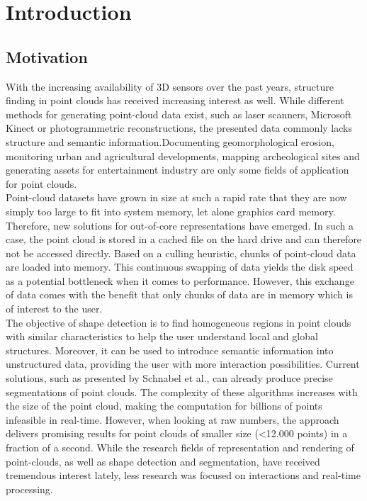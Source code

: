 \chapter{Introduction}
\newpage

\section{Motivation}

With the increasing availability of 3D sensors over the past years, structure finding in point clouds has received increasing interest as well. While different methods for generating point-cloud data exist, such as laser scanners, Microsoft Kinect or photogrammetric reconstructions, the presented data commonly lacks structure and semantic information.Documenting geomorphological erosion, monitoring urban and agricultural developments, mapping archeological sites and generating assets for entertainment industry are only some fields of application for point clouds. 
\\
Point-cloud datasets have grown in size at such a rapid rate that they are now simply too large to fit into system memory, let alone graphics card memory. Therefore, new solutions for out-of-core representations have emerged. In such a case, the point cloud is stored in a cached file on the hard drive and can therefore not be accessed directly. Based on a culling heuristic, chunks of point-cloud data are loaded into memory. 
This continuous swapping of data yields the disk speed as a potential bottleneck when it comes to performance. However, this exchange of data comes with the benefit that only chunks of data are in memory which is of interest to the user. 
\\
The objective of shape detection is to find homogeneous regions in point clouds with similar characteristics to help the user understand local and global structures. Moreover, it can be used to introduce semantic information into unstructured data, providing the user with more interaction possibilities. Current solutions, such as presented by Schnabel et al.\cite{schnabel-2007-efficient}\cite{schnabel-2007-ransac}, can already
produce precise segmentations of point clouds. The complexity of these algorithms increases with the size of the point cloud, making the computation for billions of points infeasible in real-time. However, when looking at raw numbers, the approach delivers promising results for point clouds of smaller size (<12.000 points) in a fraction of a second.
While the research fields of representation and rendering of point-clouds, as well as shape detection and segmentation,  have received tremendous interest lately, less research was focused on interactions and real-time processing. 

